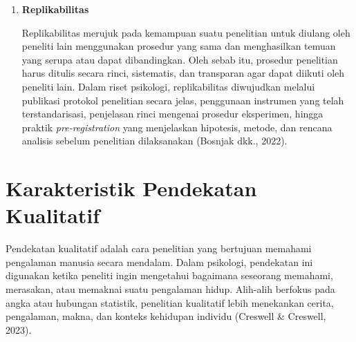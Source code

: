 \documentclass[
  indonesian,
  letterpaper,
  DIV=11,
  numbers=noendperiod]{scrreprt}
\begin{document}
\begin{enumerate}
  Kontrol variabel merupakan karakteristik penting penelitian
  kuantitatif yang bertujuan meminimalkan atau mengeliminasi pengaruh
  variabel pengganggu (\emph{confounding variables}) agar hasil
  penelitian memiliki validitas yang lebih baik. Dalam penelitian
  psikologi, kontrol variabel dapat dilakukan melalui berbagai strategi,
  seperti randomisasi peserta untuk mengurangi bias, penggunaan kelompok
  kontrol sebagai pembanding, prosedur \emph{blinding} agar partisipan
  atau peneliti tidak mengetahui perlakuan tertentu, serta standardisasi
  instruksi dan prosedur eksperimen. Sebagai contoh, dalam penelitian
  efektivitas program terapi \emph{mindfulness} berbasis web untuk
  mahasiswa, Listiyandini dkk. (2025) menyamakan durasi intervensi,
  lingkungan pelaksanaan, serta karakteristik dasar partisipan agar
  hasil penelitian lebih dapat dipercaya
\item
  \textbf{Replikabilitas}

  Replikabilitas merujuk pada kemampuan suatu penelitian untuk diulang
  oleh peneliti lain menggunakan prosedur yang sama dan menghasilkan
  temuan yang serupa atau dapat dibandingkan. Oleh sebab itu, prosedur
  penelitian harus ditulis secara rinci, sistematis, dan transparan agar
  dapat diikuti oleh peneliti lain. Dalam riset psikologi,
  replikabilitas diwujudkan melalui publikasi protokol penelitian secara
  jelas, penggunaan instrumen yang telah terstandarisasi, penjelasan
  rinci mengenai prosedur eksperimen, hingga praktik
  \emph{pre-registration} yang menjelaskan hipotesis, metode, dan
  rencana analisis sebelum penelitian dilaksanakan (Bosnjak dkk., 2022).
\end{enumerate}

\section{Karakteristik Pendekatan Kualitatif}\label{sec-karakterkuali}

Pendekatan kualitatif adalah cara penelitian yang bertujuan memahami
pengalaman manusia secara mendalam. Dalam psikologi, pendekatan ini
digunakan ketika peneliti ingin mengetahui bagaimana seseorang memahami,
merasakan, atau memaknai suatu pengalaman hidup. Alih-alih berfokus pada
angka atau hubungan statistik, penelitian kualitatif lebih menekankan
cerita, pengalaman, makna, dan konteks kehidupan individu (Creswell \&
Creswell, 2023).
\end{document}
